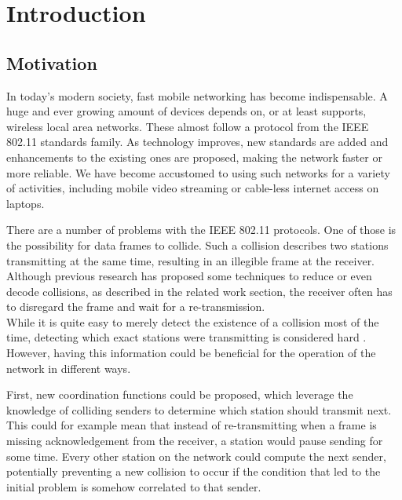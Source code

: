 \chapter{Introduction}\label{ch:introduction}
\glsresetall %



\section{Motivation}

In today's modern society, fast mobile networking has become indispensable. A huge and ever growing amount of devices depends on, or at least supports, wireless local area networks. These almost follow a protocol from the IEEE 802.11 standards family. As technology improves, new standards are added and enhancements to the existing ones are proposed, making the network faster or more reliable. We have become accustomed to using such networks for a variety of activities, including mobile video streaming or cable-less internet access on laptops.

There are a number of problems with the IEEE 802.11 protocols. One of those is the possibility for data frames to collide. Such a collision describes two stations transmitting at the same time, resulting in an illegible frame at the receiver. Although previous research has proposed some techniques to reduce or even decode collisions, as described in the related work section, the receiver often has to disregard the frame and wait for a re-transmission.\\

While it is quite easy to merely detect the existence of a collision most of the time, detecting which exact stations were transmitting is considered hard \cite{NEEDED}. However, having this information could be beneficial for the operation of the network in different ways.

First, new coordination functions could be proposed, which leverage the knowledge of colliding senders to determine which station should transmit next. This could for example mean that instead of re-transmitting when a frame is missing acknowledgement from the receiver, a station would pause sending for some time. Every other station on the network could compute the next sender, potentially preventing a new collision to occur if the condition that led to the initial problem is somehow correlated to that sender.

